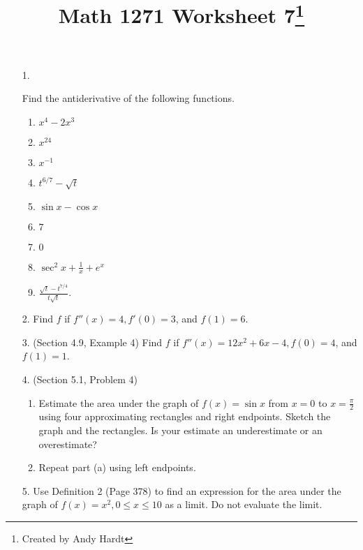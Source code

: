 \documentclass[12pt]{article}
\title{\vspace{-50pt}Math 1271 Worksheet 7\footnote{Created by Andy Hardt}}
\author{}
\date{\vspace{-70pt}}
\begin{document}
 \maketitle
{}
\begin{enumerate}

\item[1.]

Find the antiderivative of the following functions.

\begin{enumerate}

\item $x^4 - 2x^3$

\item $x^{24}$

\item $x^{-1}$

\item $t^{6/7} - \sqrt{t}$

\item $\sin x - \cos x$

\item $7$

\item $0$

\item $\sec^2 x + \frac{1}{x} + e^x$

\item $\frac{\sqrt{t} - t^{7/4}}{t\sqrt{t}}$.

\end{enumerate}
\newpage
\item[2.] Find $f$ if $f''(x) = 4, f'(0) = 3$, and $f(1) = 6$.
\vspace{10cm}
\item[3.] (Section 4.9, Example 4) Find $f$ if $f''(x) = 12x^2 + 6x - 4, f(0) = 4$, and $f(1) = 1$.
\vspace{10cm}
\item[4.] (Section 5.1, Problem 4)\begin{enumerate}

\item Estimate the area under the graph of $f(x) = \sin x$ from $x=0$ to $x=\frac{\pi}{2}$ using four approximating rectangles and right endpoints. Sketch the graph and the rectangles. Is your estimate an underestimate or an overestimate? 
\vspace{5cm}
\item Repeat part (a) using left endpoints.

\end{enumerate}
\vspace{5cm}
\item[5.] Use Definition 2 (Page 378) to find an expression for the area under the graph of $f(x) = x^2, 0\le x\le 10$ as a limit. Do not evaluate the limit.

\end{enumerate}
\end{document}
